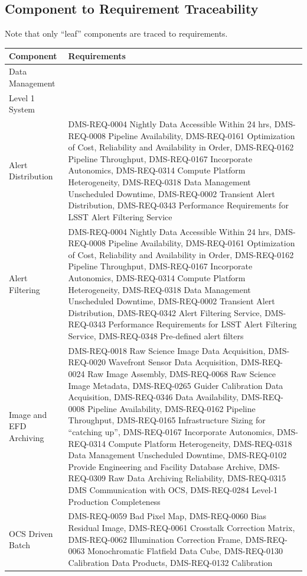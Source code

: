 \documentclass[DM,lsstdraft,toc]{lsstdoc}
\begin{document}
\subsection{Component to Requirement
Traceability}\label{component-to-requirement-traceability}

Note that only ``leaf'' components are traced to requirements.

\begin{longtable}[]{@{}ll@{}}
\toprule
Component & Requirements\tabularnewline
\midrule
\endhead
Data Management &\tabularnewline
Level 1 System &\tabularnewline
Alert Distribution & DMS-REQ-0004 Nightly Data Accessible Within 24 hrs,
DMS-REQ-0008 Pipeline Availability, DMS-REQ-0161 Optimization of Cost,
Reliability and Availability in Order, DMS-REQ-0162 Pipeline Throughput,
DMS-REQ-0167 Incorporate Autonomics, DMS-REQ-0314 Compute Platform
Heterogeneity, DMS-REQ-0318 Data Management Unscheduled Downtime,
DMS-REQ-0002 Transient Alert Distribution, DMS-REQ-0343 Performance
Requirements for LSST Alert Filtering Service\tabularnewline
Alert Filtering & DMS-REQ-0004 Nightly Data Accessible Within 24 hrs,
DMS-REQ-0008 Pipeline Availability, DMS-REQ-0161 Optimization of Cost,
Reliability and Availability in Order, DMS-REQ-0162 Pipeline Throughput,
DMS-REQ-0167 Incorporate Autonomics, DMS-REQ-0314 Compute Platform
Heterogeneity, DMS-REQ-0318 Data Management Unscheduled Downtime,
DMS-REQ-0002 Transient Alert Distribution, DMS-REQ-0342 Alert Filtering
Service, DMS-REQ-0343 Performance Requirements for LSST Alert Filtering
Service, DMS-REQ-0348 Pre-defined alert filters\tabularnewline
Image and EFD Archiving & DMS-REQ-0018 Raw Science Image Data
Acquisition, DMS-REQ-0020 Wavefront Sensor Data Acquisition,
DMS-REQ-0024 Raw Image Assembly, DMS-REQ-0068 Raw Science Image
Metadata, DMS-REQ-0265 Guider Calibration Data Acquisition, DMS-REQ-0346
Data Availability, DMS-REQ-0008 Pipeline Availability, DMS-REQ-0162
Pipeline Throughput, DMS-REQ-0165 Infrastructure Sizing for ``catching
up'', DMS-REQ-0167 Incorporate Autonomics, DMS-REQ-0314 Compute Platform
Heterogeneity, DMS-REQ-0318 Data Management Unscheduled Downtime,
DMS-REQ-0102 Provide Engineering and Facility Database Archive,
DMS-REQ-0309 Raw Data Archiving Reliability, DMS-REQ-0315 DMS
Communication with OCS, DMS-REQ-0284 Level-1 Production
Completeness\tabularnewline
OCS Driven Batch & DMS-REQ-0059 Bad Pixel Map, DMS-REQ-0060 Bias
Residual Image, DMS-REQ-0061 Crosstalk Correction Matrix, DMS-REQ-0062
Illumination Correction Frame, DMS-REQ-0063 Monochromatic Flatfield Data
Cube, DMS-REQ-0130 Calibration Data Products, DMS-REQ-0132 Calibration

\end{longtable}
\end{document}
